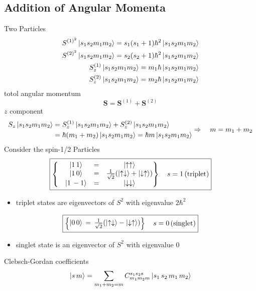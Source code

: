 \subsection{Addition of Angular Momenta}
Two Particles
\[\begin{aligned}
       S^{(1)^2} \ket{s_1 s_2 m_1 m_2} = s_1(s_1+1)\hbar^2\ket{s_1 s_2 m_1 m_2} \\
       S^{(2)^2} \ket{s_1 s_2 m_1 m_2} = s_2(s_2+1)\hbar^2\ket{s_1 s_2 m_1 m_2} \\
       S_z^{(1)}\ket{s_1 s_2 m_1 m_2}=m_1\hbar\ket{s_1 s_2 m_1 m_2} \\
       S_z^{(2)}\ket{s_1 s_2 m_1 m_2}=m_2\hbar\ket{s_1 s_2 m_1 m_2} \\
\end{aligned}\]
totol angular momentum \[\mathbf{S}=\mathbf{S}^{(1)}+\mathbf{S}^{(2)}\]
\(z\) component \[\begin{aligned}
       S_z\ket{s_1 s_2 m_1 m_2}&=S_z^{(1)}\ket{s_1 s_2 m_1 m_2}+S_z^{(2)}\ket{s_1 s_2 m_1 m_2} \\
                            &=\hbar(m_1+m_2)\ket{s_1 s_2 m_1 m_2}=\hbar m\ket{s_1 s_2 m_1 m_2}
\end{aligned}\Rightarrow\quad m=m_1+m_2\]
Consider the spin-1/2 Particles
\[\boxed{\begin{Bmatrix}
       &\ket{1\,1} & =  &\ket{\uparrow\uparrow} \\
       &\ket{1\,0} & =  &\frac{1}{\sqrt{2}}(\ket{\uparrow\downarrow}+\ket{\downarrow\uparrow}) \\
       &\ket{1\,-1} & = &\ket{\downarrow\downarrow} \\ 
     \end{Bmatrix} \quad s=1\,(\text{triplet})}\]
\begin{itemize}
       \item triplet states are eigenvectors of \(S^2\) with eigenvalue \(2\hbar^2\)
\end{itemize}
\[\boxed{\begin{Bmatrix}
       \ket{0\,0}\, = \,\frac{1}{\sqrt{2}}(\ket{\uparrow\downarrow}-\ket{\downarrow\uparrow})
     \end{Bmatrix} \quad s=0\,(\text{singlet}) }\]
\begin{itemize}
       \item singlet state is an eigenvector of \(S^2\) with eigenvalue \(0\)
\end{itemize}

Clebsch-Gordan coefficients
\[\ket{s\, m}=\sum_{m_1+m_2=m} C_{m_1m_2m}^{s_1s_2s}\ket{s_1\, s_2\, m_1 \,m_2}\]

